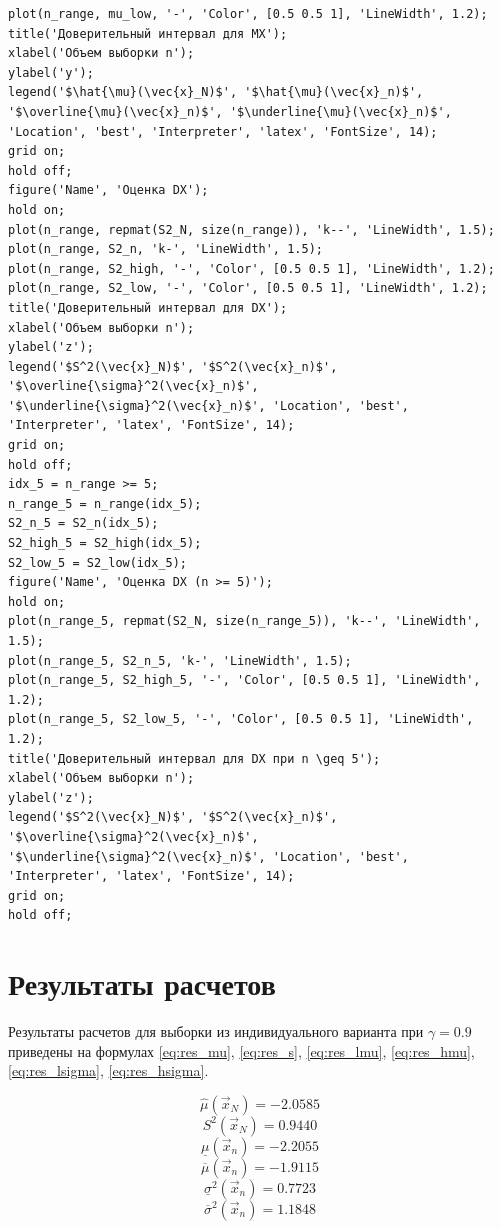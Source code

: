 \begin{lstlisting}[caption={Текст программы}, label={prog}]
plot(n_range, mu_low, '-', 'Color', [0.5 0.5 1], 'LineWidth', 1.2);
title('Доверительный интервал для MX');
xlabel('Объем выборки n');
ylabel('y');
legend('$\hat{\mu}(\vec{x}_N)$', '$\hat{\mu}(\vec{x}_n)$', '$\overline{\mu}(\vec{x}_n)$', '$\underline{\mu}(\vec{x}_n)$', 'Location', 'best', 'Interpreter', 'latex', 'FontSize', 14);
grid on;
hold off;
figure('Name', 'Оценка DX');
hold on;
plot(n_range, repmat(S2_N, size(n_range)), 'k--', 'LineWidth', 1.5);
plot(n_range, S2_n, 'k-', 'LineWidth', 1.5);
plot(n_range, S2_high, '-', 'Color', [0.5 0.5 1], 'LineWidth', 1.2);
plot(n_range, S2_low, '-', 'Color', [0.5 0.5 1], 'LineWidth', 1.2);
title('Доверительный интервал для DX');
xlabel('Объем выборки n');
ylabel('z');
legend('$S^2(\vec{x}_N)$', '$S^2(\vec{x}_n)$', '$\overline{\sigma}^2(\vec{x}_n)$', '$\underline{\sigma}^2(\vec{x}_n)$', 'Location', 'best', 'Interpreter', 'latex', 'FontSize', 14);
grid on;
hold off;
idx_5 = n_range >= 5;
n_range_5 = n_range(idx_5);
S2_n_5 = S2_n(idx_5);
S2_high_5 = S2_high(idx_5);
S2_low_5 = S2_low(idx_5);
figure('Name', 'Оценка DX (n >= 5)');
hold on;
plot(n_range_5, repmat(S2_N, size(n_range_5)), 'k--', 'LineWidth', 1.5);
plot(n_range_5, S2_n_5, 'k-', 'LineWidth', 1.5);
plot(n_range_5, S2_high_5, '-', 'Color', [0.5 0.5 1], 'LineWidth', 1.2);
plot(n_range_5, S2_low_5, '-', 'Color', [0.5 0.5 1], 'LineWidth', 1.2);
title('Доверительный интервал для DX при n \geq 5');
xlabel('Объем выборки n');
ylabel('z');
legend('$S^2(\vec{x}_N)$', '$S^2(\vec{x}_n)$', '$\overline{\sigma}^2(\vec{x}_n)$', '$\underline{\sigma}^2(\vec{x}_n)$', 'Location', 'best', 'Interpreter', 'latex', 'FontSize', 14);
grid on;
hold off;
\end{lstlisting}

\clearpage

\section{Результаты расчетов}
Результаты расчетов для выборки из индивидуального варианта при $\gamma = 0.9$ приведены на формулах \eqref{eq:res_mu}, \eqref{eq:res_s}, \eqref{eq:res_lmu}, \eqref{eq:res_hmu}, \eqref{eq:res_lsigma}, \eqref{eq:res_hsigma}.

\begin{equation}
	\label{eq:res_mu}
	\hat{\mu}(\vec{x}_N) = -2.0585
\end{equation}
\begin{equation}
	\label{eq:res_s}
	S^2(\vec{x}_N) = 0.9440
\end{equation}
\begin{equation}
	\label{eq:res_lmu}
	\underline{\mu}(\vec{x}_n) = -2.2055
\end{equation}
\begin{equation}
	\label{eq:res_hmu}
	\overline{\mu}(\vec{x}_n) = -1.9115
\end{equation}
\begin{equation}
	\label{eq:res_lsigma}
	\underline{\sigma}^2(\vec{x}_n) = 0.7723
\end{equation}
\begin{equation}
	\label{eq:res_hsigma}
	\overline{\sigma}^2(\vec{x}_n) = 1.1848
\end{equation}

